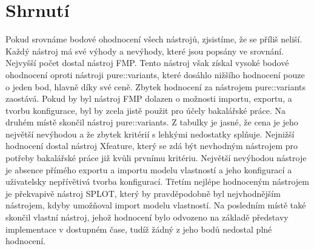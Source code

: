 \section{Shrnutí}

\begin{table}[H]
\centering
{}
\caption{Bodové ohodnocení jednotlivých nástrojů}
\end{table}

Pokud srovnáme bodové ohodnocení všech nástrojů, zjsistíme, že se příliš neliší. Každý nástroj má své výhody a nevýhody, které jsou popsány ve srovnání. Nejvyšší počet dostal nástroj FMP. Tento nástroj však získal vysoké bodové ohodnocení oproti nástroji pure::variants, které dosáhlo nižšího hodnocení pouze o jeden bod, hlavně díky své ceně. Zbytek hodnocení za nástrojem pure::variants zaostává. Pokud by byl nástroj FMP dolazen o možnosti importu, exportu, a tvorbu konfigurace, byl by zcela jistě použit pro účely bakalářské práce. Na druhém místě skončil nástroj pure::variants. Z tabulky je jasné, že cena je jeho největší nevýhodou a že zbytek kritérií s lehkými nedostatky splňuje. Nejnižší hodnocení dostal nástroj Xfeature, který se zdá být nevhodným nástrojem pro potřeby bakalářské práce již kvůli prvnímu kritériu. Největší nevýhodou nástroje je absence přímého exportu a importu modelu vlastností a jeho konfigurací a uživatelsky nepřívětivá tvorba konfigurací. Třetím nejlépe hodnoceným nástrojem je překvapivě nástroj SPLOT, který by pravděpodobně byl nejvhodnějším nástrojem, kdyby umožňoval import modelu vlastností. Na posledním místě také skončil vlastní nástroj, jehož hodnocení bylo odvozeno na základě představy implementace v dostupném čase, tudíž žádný z jeho bodů nedostal plné hodnocení. 

